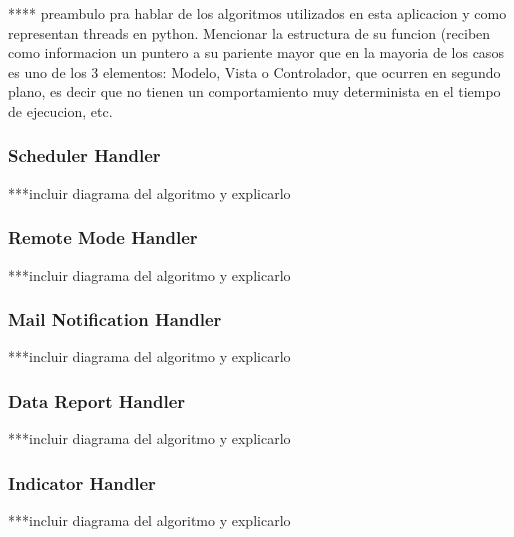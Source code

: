  **** preambulo pra hablar de los algoritmos utilizados en esta aplicacion y como representan threads en python. Mencionar la estructura de su funcion (reciben como informacion un puntero a su pariente mayor que en la mayoria de los casos es uno de los 3 elementos: Modelo, Vista o Controlador, que ocurren en segundo plano, es decir que no tienen un comportamiento muy determinista en el tiempo de ejecucion, etc.
 
 \subsubsection{Scheduler Handler}
 
 ***incluir diagrama del algoritmo y explicarlo 
 
  \subsubsection{Remote Mode Handler}
 
 ***incluir diagrama del algoritmo y explicarlo 
 
  \subsubsection{Mail Notification Handler}
 
 ***incluir diagrama del algoritmo y explicarlo 
 
   \subsubsection{Data Report Handler}
 
 ***incluir diagrama del algoritmo y explicarlo 
 
    \subsubsection{Indicator Handler}
 
 ***incluir diagrama del algoritmo y explicarlo 
 
 

